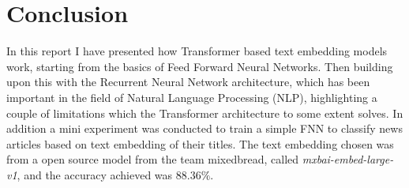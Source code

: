 \section{Conclusion}

In this report I have presented how Transformer based text embedding models work, 
starting from the basics of Feed Forward Neural Networks.
Then building upon this with the Recurrent Neural Network architecture,
which has been important in the field of Natural Language Processing (NLP),
highlighting a couple of limitations which the Transformer architecture 
to some extent solves. In addition a mini experiment was 
conducted to train a simple FNN to classify news articles based on
text embedding of their titles. The text embedding chosen was 
from a open source model from the team mixedbread, called \textit{mxbai-embed-large-v1},
and the accuracy achieved was $88.36\%$.
